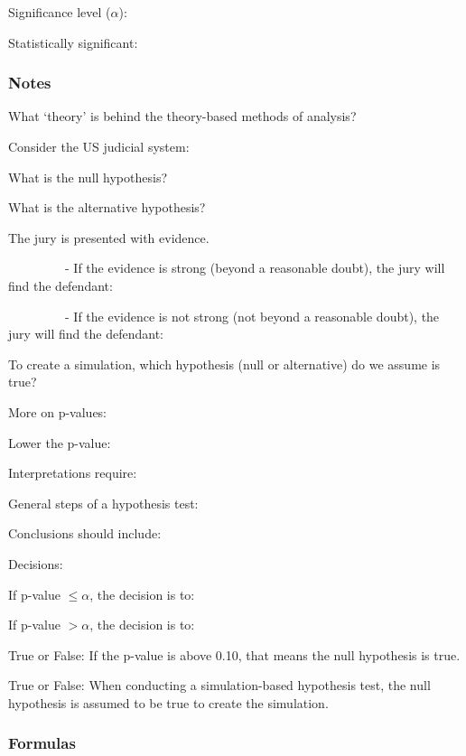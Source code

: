 \documentclass[
]{report}
\newcommand{\rgs}{\vspace{12pt}} %
\newcommand{\rgi}{\hspace{24pt}}  %
\begin{document}
Significance level (\(\alpha\)):
\rgs 

Statistically significant:
\rgs

\hypertarget{notes-15}{%
\subsubsection*{Notes}\label{notes-15}}

What `theory' is behind the theory-based methods of analysis?
\rgs

Consider the US judicial system:

\rgi What is the null hypothesis?
\rgs

\rgi What is the alternative hypothesis?
\rgs

\rgi The jury is presented with evidence.

~~~~~~~~~- If the evidence is strong (beyond a reasonable doubt), the jury will find the defendant:

\rgs

~~~~~~~~~- If the evidence is not strong (not beyond a reasonable doubt), the jury will find the defendant:

\rgs

To create a simulation, which hypothesis (null or alternative) do we assume is true?
\rgs

More on p-values:

\rgi Lower the p-value:
\rgs

\rgi Interpretations require:
\rgs

General steps of a hypothesis test:
\rgs

Conclusions should include:
\rgs

Decisions:

\rgi If p-value \(\leq \alpha\), the decision is to:

\rgi If p-value \(> \alpha\), the decision is to:

\newpage

True or False: If the p-value is above 0.10, that means the null hypothesis is true.

True or False: When conducting a simulation-based hypothesis test, the null hypothesis is assumed to be true to create the simulation.

\hypertarget{formulas}{%
\subsubsection*{Formulas}\label{formulas}}
\end{document}
